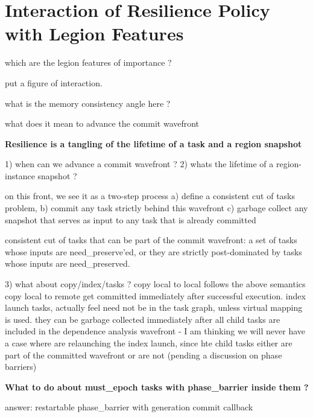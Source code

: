 
\section{Interaction of Resilience Policy with Legion Features} 

which are the legion features of importance ?

put a figure of interaction.

what is the memory consistency angle here ?

what does it mean to advance the commit wavefront

\textbf{Resilience is a tangling of the lifetime of a task and a region snapshot}
 
1) when can we advance a commit wavefront ?
2) whats the lifetime of a region-instance snapshot ?

on this front, we see it as a two-step process a) define a consistent cut of tasks problem, b) commit any task strictly behind this wavefront c) garbage collect any snapshot that serves as input to any task that is already committed

consistent cut of tasks that can be part of the commit wavefront: 
a set of tasks whose inputs are need\_preserve'ed, or they are strictly post-dominated by tasks whose inputs are need\_preserved.  

3) what about copy/index/tasks ?
copy local to local follows the above semantics
copy local to remote get committed immediately after successful execution.
index launch tasks, actually feel need not be in the task graph, unless virtual mapping is used. they can be garbage collected immediately after all child tasks are included in the dependence analysis wavefront
  - I am thinking we will never have a case where are relaunching the index launch, since hte child tasks either are part of the committed wavefront or are not (pending a discussion on phase barriers)


\textbf{What to do about must\_epoch tasks with phase\_barrier inside them ?}

answer: restartable phase\_barrier with generation commit callback 
